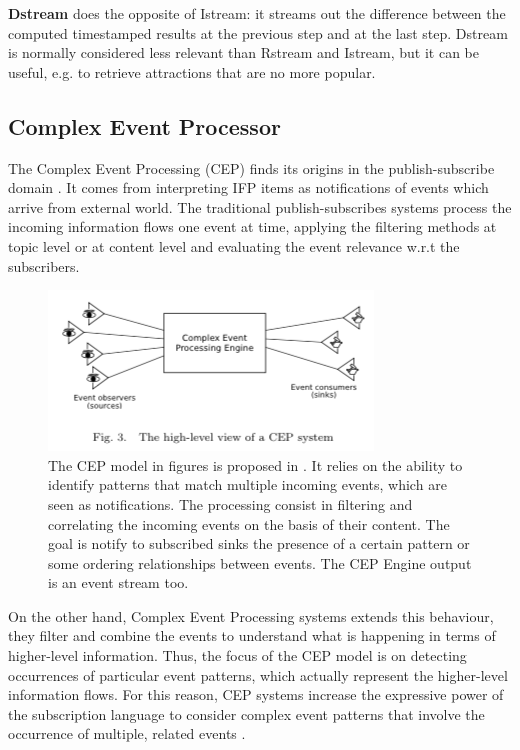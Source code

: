 \textbf{Dstream} does the opposite of Istream: it streams out the difference between the computed timestamped results at the previous step and at the last step. Dstream is normally considered less relevant than Rstream and Istream, but it can be useful, e.g. to retrieve attractions that are no more popular.


\subsection{Complex Event Processor}\label{sec:cep}

The Complex Event Processing (CEP) finds its origins in the publish-subscribe domain \cite{Eugster:2003:MFP:857076.857078}. It comes from interpreting IFP items as notifications of events which arrive from  external world. The traditional publish-subscribes systems process the incoming information flows one event at time, applying the filtering methods at topic level or at content level and evaluating the event relevance w.r.t the subscribers. 

\begin{figure}[tbh]
  \centering
	\includegraphics[width=0.75\linewidth]{images/cep}
	\caption[CEP Model proposed]{The CEP model in figures is proposed in \cite{Cugola:2012:PFI:2187671.2187677}. It relies on the ability to identify patterns that match multiple incoming events, which are seen as notifications. The processing consist in filtering and correlating the incoming events on the basis of their content. The goal is notify to subscribed sinks the presence of a certain pattern or some ordering relationships between events. The CEP Engine output is an event stream too.} 
  	\label{fig:cep}
\end{figure}

On the other hand, Complex Event Processing systems extends this behaviour, they filter and combine the events to understand what is happening in terms of higher-level information. Thus, the focus of the CEP model is on detecting occurrences of particular event patterns, which actually represent the higher-level information flows. For this reason, CEP systems increase the expressive power of the subscription language to consider complex event patterns that involve the occurrence of multiple, related events \cite{Cugola:2012:PFI:2187671.2187677}.



